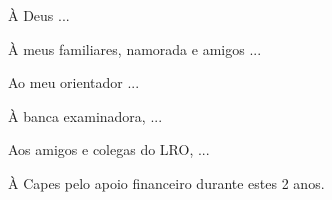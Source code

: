 \begin{agradecimentos}
À Deus ...

À meus familiares, namorada e amigos ...

Ao meu orientador ...

À banca examinadora, ...

Aos amigos e colegas do LRO, ...

À Capes pelo apoio financeiro durante estes 2 anos. 

\end{agradecimentos}
\newpage